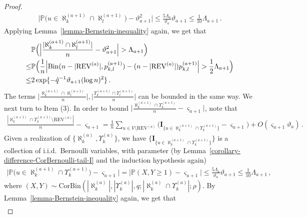\documentclass[11pt]{article}
\numberwithin{equation}{section}
\begin{document}
\begin{proof}
\begin{align*}
    \Big| \mathbb{P}\Big(u \in \aleph^{(a+1)}_k \cap \aleph^{(a+1)}_l \Big) - \vartheta_{a+1}^2 \Big| \leq \frac{5 \Lambda_{a}}{\vartheta_{a}} \vartheta_{a+1} \leq \frac{1}{10} \Lambda_{a+1} \,.
\end{align*}
Applying Lemma~\ref{lemma-Bernstein-inequality} again, we get that
\begin{align}
    & \mathbb{P} \Big(\Big| \frac{|\aleph^{(a+1)}_k \cap \aleph^{(a+1)}_l|}{n} - \vartheta_{a+1}^2 \Big| > \Lambda_{a+1} \Big)  \nonumber \\
    \leq & \mathbb{P}\Big( \frac{1}{n} \Big| \mathrm{Bin}( n-|\mathrm{REV}^{(a)}|, p^{(a+1)}_{k,l} ) - (n-|\mathrm{REV}^{(a)}|) p^{(a+1)}_{k,l} \Big| > \frac{1}{2} \Lambda_{a+1} \Big)  \nonumber \\
    \leq & 2 \exp \{ - \Hat{q}^{-1} \vartheta_{a+1} (\log n)^2 \} \,.
    \label{equ-concentration-result-2-a>0}
\end{align}
The terms $\big| \frac{\aleph^{(a+1)}_k \cap \aleph^{(a+1)}_l}{n} \big|, \big| \frac{\Upsilon^{(a+1)}_k \cap \Upsilon^{(a+1)}_l}{n} \big|$ can be bounded in the same way. We next turn to Item (3). In order to bound $\big| \frac{\aleph^{(a+1)}_k \cap \Upsilon^{(a+1)}_k}{n} - \varsigma_{a+1} \big|$, note that 
\begin{align*}
    \frac{|\aleph^{(a+1)}_k \cap \Upsilon^{(a+1)}_k \setminus \mathrm{REV}^{(a)}|}{n} - \varsigma_{a+1} 
    = \frac{1}{n} \sum_{ u \in V \setminus \mathrm{REV}^{(a)} }  \Big( \mathbf{I}_{ \{ u \in \aleph^{(a+1)}_k \cap \Upsilon^{(a+1)}_k \} } - \varsigma_{a+1} \Big) + O(\varsigma_{a+1} \vartheta_{a}) \,.
\end{align*}
Given a realization of $\{ \aleph^{(a)}_k, \Upsilon^{(a)}_k \}$, we have $\{\mathbf{I}_{ \{ u \in \aleph^{(a+1)}_k \cap \Upsilon^{(a+1)}_k \}}\}$ is a collection of i.i.d.\ Bernoulli variables, with parameter (by Lemma~\ref{corollary-difference-CorBernoulli-tail-I} and the induction hypothesis again)
\begin{align*}
     \Big| \mathbb{P}\Big( u \in \aleph^{(a+1)}_k \cap \Upsilon^{(a+1)}_k \Big) - \varsigma_{a+1} \Big| =  \Big| \mathbb{P} ( X,Y \geq 1) - \varsigma_{a+1} \Big| \leq \frac{ 5 \Lambda_{a} }{ \vartheta_{a} } \vartheta_{a+1} \leq \frac{1}{10} \Lambda_{a+1}  \,,
\end{align*}
where $(X, Y) \sim \mathrm{CorBin}(|\aleph^{(a)}_k|, |\Upsilon^{(a)}_k|, q; |\aleph^{(a)}_k \cap \Upsilon^{(a)}_k|; \rho)$.
By Lemma~\ref{lemma-Bernstein-inequality} again, we get that
\begin{align}

\end{align}
\end{proof}
\end{document}
